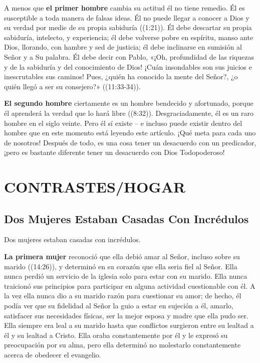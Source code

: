 \documentclass[12pt, twoside, openright]{book}
\begin{document}
A menos que \textbf{el primer hombre} cambia su actitud él no tiene remedio. Él es susceptible a toda manera de falsas ideas. Él no puede llegar a conocer a Dios y su verdad por medie de su propia sabiduría ((1:21)). Él debe descartar su propia sabiduría, intelecto, y experiencia; él debe volverse pobre en espíritu, manso ante Dios, llorando, con hambre y sed de justicia; él debe inclinarse en sumisión al Señor y a Su palabra. Él debe decir con Pablo, «¡Oh, profundidad de las riquezas y de la sabiduría y del conocimiento de Dios! ¡Cuán insondables son sus juicios e inescrutables sus caminos! Pues, ¿quién ha conocido la mente del Señor?, ¿o quién llegó a ser su consejero?» ((11:33-34)).

\textbf{El segundo hombre} ciertamente es un hombre bendecido y afortunado, porque él aprenderá la verdad que lo hará libre ((8:32)). Desgraciadamente, él es un raro hombre en el siglo veinte. Pero él sí existe – e incluso puede existir dentro del hombre que en este momento está leyendo este artículo. ¡Qué meta para cada uno de nosotros! Después de todo, es una cosa tener un desacuerdo con un predicador, ¡pero es bastante diferente tener un desacuerdo con Dios Todopoderoso!

\chapter{CONTRASTES/HOGAR}

\section{Dos Mujeres Estaban Casadas Con Incrédulos}
Dos mujeres estaban casadas con incrédulos. 

\textbf{La primera mujer} reconoció que ella debió amar al Señor, incluso sobre su marido ((14:26)), y determinó en su corazón que ella seria fiel al Señor. Ella nunca perdió un servicio de la iglesia solo para estar con su marido. Ella nunca traicionó sus principios para participar en alguna actividad cuestionable con él. A la vez ella nunca dio a su marido razón para cuestionar su amor; de hecho, él podía ver que su fidelidad al Señor la guio a estar en sujeción a él, amarlo, satisfacer sus necesidades físicas, ser la mejor esposa y madre que ella pudo ser. Ella siempre era leal a su marido hasta que conflictos surgieron entre su lealtad a él y su lealtad a Cristo. Ella oraba constantemente por él y le expresó su preocupación por su alma, pero ella determinó no molestarlo constantemente acerca de obedecer el evangelio. 
\end{document}
